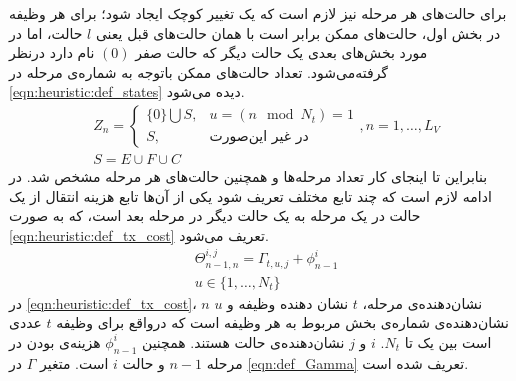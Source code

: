 برای حالت‌های هر مرحله نیز لازم است که یک تغییر کوچک ایجاد شود؛ برای هر وظیفه در بخش اول، حالت‌های ممکن برابر است با همان حالت‌های قبل یعنی $l$ حالت، اما در مورد بخش‌های بعدی یک حالت دیگر که حالت صفر $(0)$ نام دارد درنظر گرفته‌می‌شود. تعداد حالت‌های ممکن باتوجه به شماره‌ی مرحله در \cref{eqn:heuristic:def_states} دیده می‌شود. 
\begin{subequations}\label{eqn:heuristic:def_states}
	\begin{align}
		&Z_n =
		\begin{cases}
			\{0\} \bigcup S, & \text{$u = (n \mod N_t) = 1$} \\
			S,               & \text{در غیر این‌صورت}
		\end{cases}
		,n = 1, \dots, L_V \\
		&S = E \cup F \cup C
	\end{align}
\end{subequations}
بنابراین تا اینجای کار تعداد مرحله‌ها و همچنین حالت‌های هر مرحله مشخص شد. در ادامه لازم است که چند تابع مختلف تعریف شود یکی از آن‌ها تابع هزینه انتقال از یک حالت در یک مرحله به یک حالت دیگر در مرحله بعد است، که به صورت \cref{eqn:heuristic:def_tx_cost} تعریف می‌شود. 
\begin{subequations}
	\begin{align}\label{eqn:heuristic:def_tx_cost}
		&\Theta_{n-1,n}^{i,j} = \Gamma_{t,u,j} + \phi_{n-1}^i \\
		&u \in \{1, \dots, N_t\}
	\end{align}
\end{subequations}
در \cref{eqn:heuristic:def_tx_cost}، $n$ نشان‌دهنده‌ی مرحله، $t$ نشان دهنده وظیفه و $u$ نشان‌دهنده‌ی شماره‌ی بخش مربوط به هر وظیفه است که درواقع برای وظیفه $t$ عددی است بین یک تا $N_t$. $i$ و $j$ نشان‌دهنده‌ی حالت هستند. همچنین $\phi_{n-1}^i$ هزینه‌ی بودن در مرحله $n-1$ و حالت $i$ است. متغیر $\Gamma$ در \cref{eqn:def_Gamma} تعریف شده است. 


